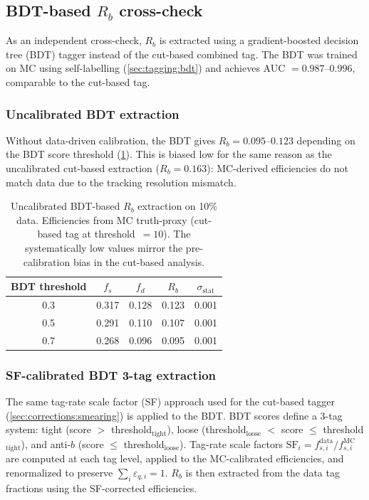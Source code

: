 \documentclass[11pt,a4paper]{article}
\begin{document}
\subsection{BDT-based $R_b$ cross-check}
\label{sec:crosscheck:bdt}

As an independent cross-check, $R_b$ is extracted using a
gradient-boosted decision tree (BDT) tagger instead of the
cut-based combined tag.
The BDT was trained on MC using self-labelling
(\cref{sec:tagging:bdt}) and achieves
AUC $= 0.987$--$0.996$, comparable to the cut-based tag.

\subsubsection{Uncalibrated BDT extraction}

Without data-driven calibration, the BDT gives $R_b = 0.095$--$0.123$
depending on the BDT score threshold (\cref{tbl:bdt_crosscheck_uncal}).
This is biased low for the same reason as the uncalibrated cut-based
extraction ($R_b = 0.163$): MC-derived efficiencies do not match data
due to the tracking resolution mismatch.

\begin{table}[htbp]
\centering
\caption{Uncalibrated BDT-based $R_b$ extraction on 10\% data.
Efficiencies from MC truth-proxy (cut-based tag at threshold~$=10$).
The systematically low values mirror the pre-calibration bias in
the cut-based analysis.}
\label{tbl:bdt_crosscheck_uncal}
\begin{tabular}{ccccc}
\toprule
BDT threshold & $f_s$ & $f_d$ & $R_b$ & $\sigma_\text{stat}$ \\
\midrule
0.3 & 0.317 & 0.128 & 0.123 & 0.001 \\
0.5 & 0.291 & 0.110 & 0.107 & 0.001 \\
0.7 & 0.268 & 0.096 & 0.095 & 0.001 \\
\bottomrule
\end{tabular}
\end{table}

\subsubsection{SF-calibrated BDT 3-tag extraction}

The same tag-rate scale factor (SF) approach used for the cut-based
tagger (\cref{sec:corrections:smearing}) is applied to the BDT.
BDT scores define a 3-tag system: tight (score $>$ threshold$_\text{tight}$),
loose (threshold$_\text{loose}$ $<$ score $\leq$ threshold$_\text{tight}$),
and anti-$b$ (score $\leq$ threshold$_\text{loose}$).
Tag-rate scale factors $\text{SF}_i = f_{s,i}^\text{data} / f_{s,i}^\text{MC}$
are computed at each tag level, applied to the MC-calibrated efficiencies,
and renormalized to preserve $\sum_i \varepsilon_{q,i} = 1$.
$R_b$ is then extracted from the data tag fractions using the
SF-corrected efficiencies.
\end{document}
